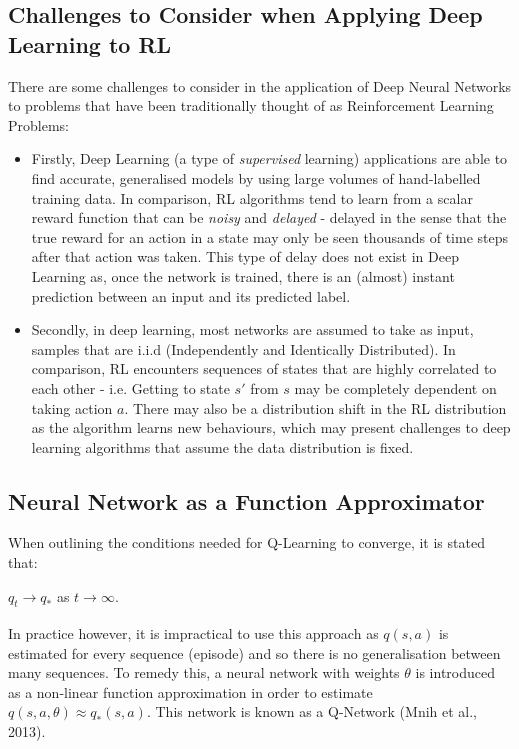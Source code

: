 \documentclass{article}
\begin{document}
\subsection{Challenges to Consider when Applying Deep Learning to RL}

There are some challenges to consider in the application of Deep Neural Networks to problems that have been traditionally thought of as Reinforcement Learning Problems:

\begin{itemize}
    \item Firstly, Deep Learning (a type of \textit{supervised} learning) applications are able to find accurate, generalised models by using large volumes of hand-labelled training data. In comparison, RL algorithms tend to learn from a scalar reward function that can be \textit{noisy} and \textit{delayed} - delayed in the sense that the true reward for an action in a state may only be seen thousands of time steps after that action was taken. This type of delay does not exist in Deep Learning as, once the network is trained, there is an (almost) instant prediction between an input and its predicted label.
    
    \item Secondly, in deep learning, most networks are assumed to take as input, samples that are i.i.d (Independently and Identically Distributed). In comparison, RL encounters sequences of states that are highly correlated to each other - i.e. Getting to state $s'$ from $s$ may be completely dependent on taking action $a$. There may also be a distribution shift in the RL distribution as the algorithm learns new behaviours, which may present challenges to deep learning algorithms that assume the data distribution is fixed.
    
\end{itemize}


\subsection{Neural Network as a Function Approximator}

When outlining the conditions needed for Q-Learning to converge, it is stated that: 

$q_t \xrightarrow[]{} q_*$ as $t \xrightarrow[]{} \infty$. 


In practice however, it is impractical to use this approach as $q(s,a)$ is estimated for every sequence (episode) and so there is no generalisation between many sequences. To remedy this, a neural network with weights $\theta$ is introduced as a non-linear function approximation in order to estimate $q(s, a, \theta) \approx q_*(s,a)$. This network is known as a Q-Network (Mnih et al., 2013).  
\end{document}

